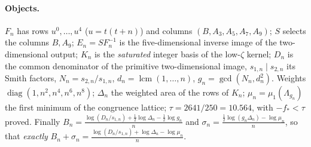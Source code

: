 \documentclass[11pt]{article}
\DeclareMathOperator{\lcm}{lcm}
\begin{document}
\paragraph{Objects.} $F_n$ has rows $u^0,\dots,u^4$ ($u=t(t+n)$) and columns $(B,A_3,A_5,A_7,A_9)$;
$S$ selects the columns $B,A_9$; $E_n=SF_n^{-1}$ is the five-dimensional inverse image of the
two-dimensional output; $K_n$ is the \emph{saturated} integer basis of the low-$\zeta$ kernel;
$D_n$ is the common denominator of the primitive two-dimensional image, $s_{1,n}\mid s_{2,n}$ its
Smith factors, $N_n=s_{2,n}/s_{1,n}$, $d_n=\lcm(1,\dots,n)$, $g_n=\gcd(N_n,d_n^2)$. Weights
$\operatorname{diag}(1,n^2,n^4,n^6,n^8)$; $\Delta_n$ the weighted area of the rows of $K_n$;
$\mu_n=\mu_1(\Lambda_{g_n})$ the first minimum of the congruence lattice; $\tau=2641/250=10.564$,
with $-f_*<\tau$ proved. Finally
$B_n=\frac{\log(D_n/s_{1,n})+\frac12\log\Delta_n-\frac12\log g_n}{n}$ and
$\sigma_n=\frac{\frac12\log(g_n\Delta_n)-\log\mu_n}{n}$, so that \emph{exactly}
$B_n+\sigma_n=\frac{\log(D_n/s_{1,n})+\log\Delta_n-\log\mu_n}{n}$.
\end{document}
